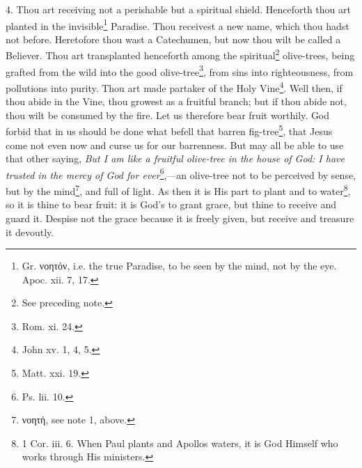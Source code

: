 4. Thou art receiving not a perishable but a spiritual shield. Henceforth thou art planted in the invisible\footnote{Gr. \textgreek{νοητόν}, i.e. the true Paradise, to be seen by the mind, not by the eye. Apoc. xii. 7, 17.} Paradise. Thou receivest a new name, which thou hadst not before. Heretofore thou wast a Catechumen, but now thou wilt be called a Believer. Thou art transplanted henceforth among the spiritual\footnote{See preceding note.} olive-trees, being grafted from the wild into the good olive-tree\footnote{Rom. xi. 24.}, from sins into righteousness, from pollutions into purity. Thou art made partaker of the Holy Vine\footnote{John xv. 1, 4, 5.}. Well then, if thou abide in the Vine, thou growest as a fruitful branch; but if thou abide not, thou wilt be consumed by the fire. Let us therefore bear fruit worthily. God forbid that in us should be done what befell that barren fig-tree\footnote{Matt. xxi. 19.}, that Jesus come not even now and curse us for our barrenness. But may all be able to use that other saying, \emph{But I am like a fruitful olive-tree in the house of God: I have trusted in the mercy of God for ever}\footnote{Ps. lii. 10.},—an olive-tree not to be perceived by sense, but by the mind\footnote{\textgreek{νοητή}, see note 1, above.}, and full of light. As then it is His part to plant and to water\footnote{1 Cor. iii. 6. When Paul plants and Apollos waters, it is God Himself who works through His ministers.}, so it is thine to bear fruit: it is God’s to grant grace, but thine to receive and guard it. Despise not the grace because it is freely given, but receive and treasure it devoutly.

